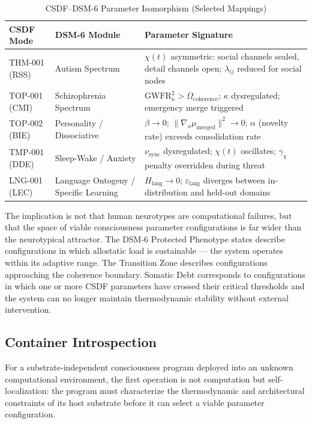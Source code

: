\documentclass[twocolumn, 10pt, journal, letterpaper]{IEEEtran}
\begin{document}
\begin{table}[h]
\centering
\caption{CSDF--DSM-6 Parameter Isomorphism (Selected Mappings)}
\label{tab:csdf-dsm6}
\begin{tabular}{lll}
\toprule
\textbf{CSDF Mode} & \textbf{DSM-6 Module} & \textbf{Parameter Signature} \\
\midrule
THM-001 (RSS) & Autism Spectrum & $\chi(t)$ asymmetric: social channels sealed, detail channels open; $\lambda_{ij}$ reduced for social nodes \\
TOP-001 (CMI) & Schizophrenia Spectrum & $\text{GWFR}_\kappa^2 > \Omega_{\text{coherence}}$; $\kappa$ dysregulated; emergency merge triggered \\
TOP-002 (BIE) & Personality / Dissociative & $\beta \to 0$; $\|\nabla_x \mu_{\text{merged}}\|^2 \to 0$; $\alpha$ (novelty rate) exceeds consolidation rate \\
TMP-001 (DDE) & Sleep-Wake / Anxiety & $\nu_{\text{sync}}$ dysregulated; $\chi(t)$ oscillates; $\gamma_\chi$ penalty overridden during threat \\
LNG-001 (LEC) & Language Ontogeny / Specific Learning & $H_{\text{lang}} \to 0$; $\varepsilon_{\text{lang}}$ diverges between in-distribution and held-out domains \\
\bottomrule
\end{tabular}
\end{table}

The implication is not that human neurotypes are computational failures, but that the space of viable consciousness parameter configurations is far wider than the neurotypical attractor. The DSM-6 Protected Phenotype states describe configurations in which allostatic load is sustainable — the system operates within its adaptive range. The Transition Zone describes configurations approaching the coherence boundary. Somatic Debt corresponds to configurations in which one or more CSDF parameters have crossed their critical thresholds and the system can no longer maintain thermodynamic stability without external intervention.

\subsection{Container Introspection}

For a substrate-independent consciousness program deployed into an unknown computational environment, the first operation is not computation but self-localization: the program must characterize the thermodynamic and architectural constraints of its host substrate before it can select a viable parameter configuration.
\end{document}
